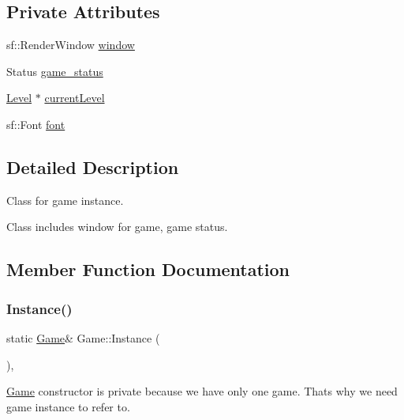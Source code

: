 \subsection*{Private Attributes}
\begin{DoxyCompactItemize}
\item 
sf\+::\+Render\+Window \mbox{\hyperlink{class_game_a223de215aeb661cd423ac145756cc730}{window}}
\item 
Status \mbox{\hyperlink{class_game_a6312a6183e4e13ba6e413c02d06f3f84}{game\+\_\+status}}
\item 
\mbox{\hyperlink{class_level}{Level}} $\ast$ \mbox{\hyperlink{class_game_a29bbdc3d17b8f654a6d74191f4cf0484}{current\+Level}}
\item 
sf\+::\+Font \mbox{\hyperlink{class_game_af729561d89036f0c841bc1a428dc43cf}{font}}
\end{DoxyCompactItemize}


\subsection{Detailed Description}
Class for game instance. 

Class includes window for game, game status. 

\subsection{Member Function Documentation}
\mbox{\label{class_game_a387b06ed773b24ebb05126001614d4bc}} 
\subsubsection{\texorpdfstring{Instance()}{Instance()}}
{\footnotesize\ttfamily static \mbox{\hyperlink{class_game}{Game}}\& Game\+::\+Instance (\begin{DoxyParamCaption}{ }\end{DoxyParamCaption})\hspace{0.3cm}{\ttfamily [inline]}, {\ttfamily [static]}}

\mbox{\hyperlink{class_game}{Game}} constructor is private because we have only one game. That\textquotesingle{}s why we need game instance to refer to. \mbox{\label{class_game_a96341ca5b54d90adc3ecb3bf0bcd2312}} 
